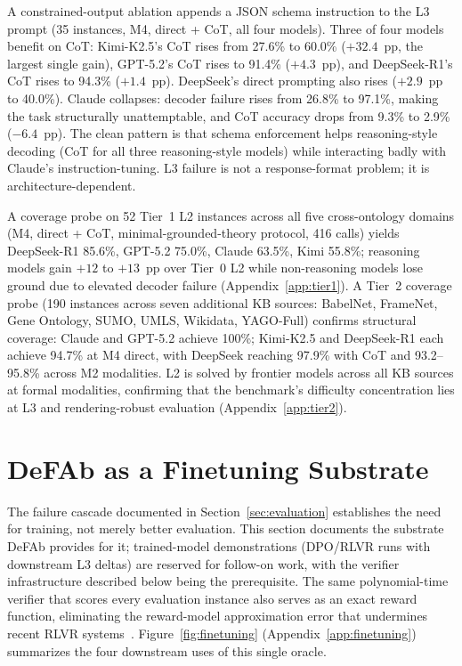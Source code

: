 \documentclass{article}
\theoremstyle{definition}
\begin{document}
A constrained-output ablation appends a JSON schema instruction to the L3 prompt (35 instances, M4, direct + CoT, all four models). Three of four models benefit on CoT: Kimi-K2.5's CoT rises from 27.6\% to 60.0\% ($+32.4$~pp, the largest single gain), GPT-5.2's CoT rises to 91.4\% ($+4.3$~pp), and DeepSeek-R1's CoT rises to 94.3\% ($+1.4$~pp). DeepSeek's direct prompting also rises ($+2.9$~pp to 40.0\%). Claude collapses: decoder failure rises from 26.8\% to 97.1\%, making the task structurally unattemptable, and CoT accuracy drops from 9.3\% to 2.9\% ($-6.4$~pp). The clean pattern is that schema enforcement helps reasoning-style decoding (CoT for all three reasoning-style models) while interacting badly with Claude's instruction-tuning. L3 failure is not a response-format problem; it is architecture-dependent.

A coverage probe on 52 Tier~1 L2 instances across all five cross-ontology domains (M4, direct + CoT, minimal-grounded-theory protocol, 416 calls) yields DeepSeek-R1 85.6\%, GPT-5.2 75.0\%, Claude 63.5\%, Kimi 55.8\%; reasoning models gain $+12$ to $+13$~pp over Tier~0 L2 while non-reasoning models lose ground due to elevated decoder failure (Appendix~\ref{app:tier1}). A Tier~2 coverage probe (190 instances across seven additional KB sources: BabelNet, FrameNet, Gene Ontology, SUMO, UMLS, Wikidata, YAGO-Full) confirms structural coverage: Claude and GPT-5.2 achieve 100\%; Kimi-K2.5 and DeepSeek-R1 each achieve 94.7\% at M4 direct, with DeepSeek reaching 97.9\% with CoT and 93.2--95.8\% across M2 modalities. L2 is solved by frontier models across all KB sources at formal modalities, confirming that the benchmark's difficulty concentration lies at L3 and rendering-robust evaluation (Appendix~\ref{app:tier2}).


\section{DeFAb as a Finetuning Substrate}\label{sec:finetuning}

The failure cascade documented in Section~\ref{sec:evaluation} establishes the need for training, not merely better evaluation. This section documents the substrate DeFAb provides for it; trained-model demonstrations (DPO/RLVR runs with downstream L3 deltas) are reserved for follow-on work, with the verifier infrastructure described below being the prerequisite. The same polynomial-time verifier that scores every evaluation instance also serves as an exact reward function, eliminating the reward-model approximation error that undermines recent RLVR systems~\citep{ouyang2022training, zheng2025verifybench, rlbff2025}. Figure~\ref{fig:finetuning} (Appendix~\ref{app:finetuning}) summarizes the four downstream uses of this single oracle.
\end{document}
